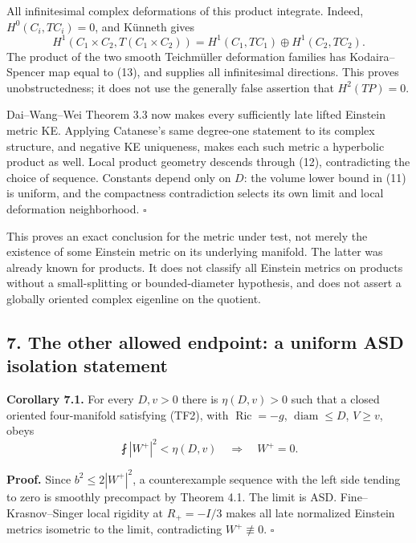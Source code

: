 \documentclass[
  11pt,
]{article}
\begin{document}
All infinitesimal complex deformations of this product integrate.
Indeed, \(H^0(C_i,TC_i)=0\), and Künneth gives \[
 H^1(C_1\times C_2,T(C_1\times C_2))
       =H^1(C_1,TC_1)\oplus H^1(C_2,TC_2).                 \tag{13}
\] The product of the two smooth Teichmüller deformation families has
Kodaira--Spencer map equal to (13), and supplies all infinitesimal
directions. This proves unobstructedness; it does not use the generally
false assertion that \(H^2(TP)=0\).

Dai--Wang--Wei Theorem 3.3 now makes every sufficiently late lifted
Einstein metric KE. Applying Catanese's same degree-one statement to its
complex structure, and negative KE uniqueness, makes each such metric a
hyperbolic product as well. Local product geometry descends through
(12), contradicting the choice of sequence. Constants depend only on
\(D\): the volume lower bound in (11) is uniform, and the compactness
contradiction selects its own limit and local deformation neighborhood.
\(\square\)

This proves an exact conclusion for the metric under test, not merely
the existence of some Einstein metric on its underlying manifold. The
latter was already known for products. It does not classify all Einstein
metrics on products without a small-splitting or bounded-diameter
hypothesis, and does not assert a globally oriented complex eigenline on
the quotient.

\hypertarget{the-other-allowed-endpoint-a-uniform-asd-isolation-statement}{%
\subsection{7. The other allowed endpoint: a uniform ASD isolation
statement}\label{the-other-allowed-endpoint-a-uniform-asd-isolation-statement}}

\textbf{Corollary 7.1.} For every \(D,v>0\) there is \(\eta(D,v)>0\)
such that a closed oriented four-manifold satisfying (TF2), with
\(\operatorname{Ric}=-g\), \(\operatorname{diam}\le D\), \(V\ge v\),
obeys \[
                \fint|W^+|^2<\eta(D,v)
                         \quad\Longrightarrow\quad W^+=0. \tag{14}
\]

\textbf{Proof.} Since \(b^2\le2|W^+|^2\), a counterexample sequence with
the left side tending to zero is smoothly precompact by Theorem 4.1. The
limit is ASD. Fine--Krasnov--Singer local rigidity at \(R_+=-I/3\) makes
all late normalized Einstein metrics isometric to the limit,
contradicting \(W^+\not\equiv0\). \(\square\)
\end{document}
